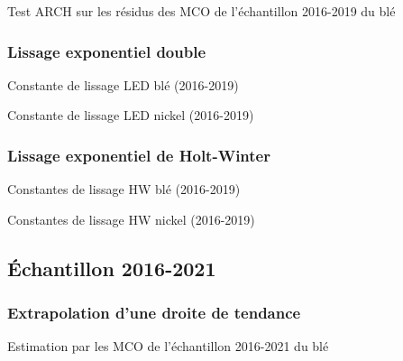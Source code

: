 \documentclass[12pt,a4paper]{article}
\begin{document}
\begin{table}[H]
    \centering
    \caption{Test ARCH sur les résidus des MCO de l'échantillon 2016-2019 du blé}
    \sffamily
    
    \label{tab:extra_arch_ble19}
\end{table}

\subsubsection{Lissage exponentiel double}
\begin{table}[H]
    \centering
    \caption{Constante de lissage LED blé (2016-2019)}
    \sffamily
    
    \label{tab:led_ble19}
\end{table}

\begin{table}[H]
    \centering
    \caption{Constante de lissage LED nickel (2016-2019)}
    \sffamily
    
    \label{tab:led_nickel19}
\end{table}

\subsubsection{Lissage exponentiel de Holt-Winter}
\begin{table}[H]
    \centering
    \caption{Constantes de lissage HW blé (2016-2019)}
    \sffamily
    
    \label{tab:hwout_ble19}
\end{table}
\begin{table}[H]
    \centering
    \caption{Constantes de lissage HW nickel (2016-2019)}
    \sffamily
    
    \label{tab:hwout_nickel19}
\end{table}


\subsection{Échantillon 2016-2021}
\subsubsection{Extrapolation d'une droite de tendance}
\begin{table}[H]
    \centering
    \caption{Estimation par les MCO de l'échantillon 2016-2021 du blé}
    \sffamily
    \label{tab:mco_ble21}
    
\end{table}
\end{document}
